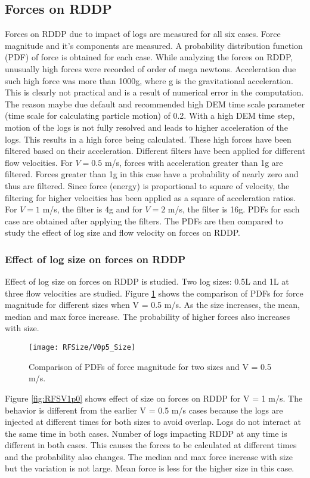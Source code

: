 \subsection{Forces on RDDP}
Forces on RDDP due to impact of logs are measured for all six cases. Force magnitude and it's components are measured. A probability distribution function (PDF) of force is obtained for each case. While analyzing the forces on RDDP, unusually high forces were recorded of order of mega newtons. Acceleration due such high force was more than 1000g, where g is the gravitational acceleration. This is clearly not practical and is a result of numerical error in the computation. The reason maybe due default and recommended high DEM time scale parameter (time scale for calculating particle motion) of 0.2. With a high DEM time step, motion of the logs is not fully resolved and leads to higher acceleration of the logs. This results in a high force being calculated. These high forces have been filtered based on their acceleration. Different filters have been applied for different flow velocities. For $V = 0.5$ m/s, forces with acceleration greater than 1g are filtered. Forces greater than 1g in this case have a probability of nearly zero and thus are filtered. Since force (energy) is proportional to square of velocity, the filtering for higher velocities has been applied as a square of acceleration ratios. For $V = 1$ m/s, the filter is 4g and for $V = 2$ m/s, the filter is 16g. PDFs for each case are obtained after applying the filters. The PDFs are then compared to study the effect of log size and flow velocity on forces on RDDP.\\
\subsubsection{Effect of log size on forces on RDDP}
Effect of log size on forces on RDDP is studied. Two log sizes: 0.5L and 1L at three flow velocities are studied. Figure \ref{fig:RFSV0p5} shows the comparison of PDFs for force magnitude for different sizes when V = 0.5 m/s. As the size increases, the mean, median and max force increase. The probability of higher forces also increases with size. 

\begin{figure}[H]
\centering
\texttt{[image: RFSize/V0p5\_Size]}
\caption{\label{fig:RFSV0p5}Comparison of PDFs of force magnitude for two sizes and V = 0.5 m/s.}
\end{figure} 

\noindent Figure \ref{fig:RFSV1p0} shows effect of size on forces on RDDP for V = 1 m/s. The behavior is different from the earlier V = 0.5 m/s cases because the logs are injected at different times for both sizes to avoid overlap. Logs do not interact at the same time in both cases. Number of logs impacting RDDP at any time is different in both cases. This causes the forces to be calculated at different times and the probability also changes. The median and max force increase with size but the variation is not large. Mean force is less for the higher size in this case. 

